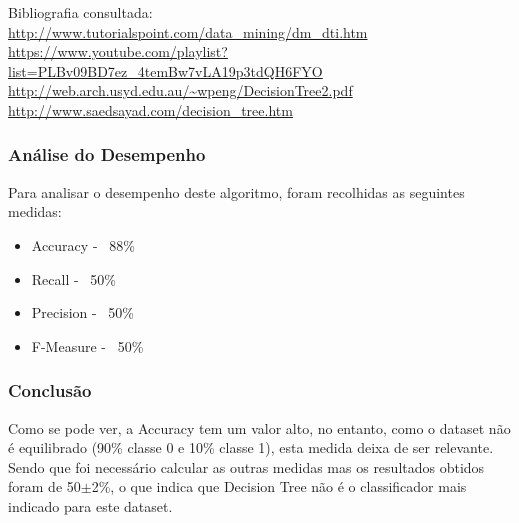 \documentclass[portugues,final]{revdetua}
\begin{document}
Bibliografia consultada:\\
\url{http://www.tutorialspoint.com/data_mining/dm_dti.htm}\\
\url{https://www.youtube.com/playlist?list=PLBv09BD7ez_4temBw7vLA19p3tdQH6FYO }\\
\url{http://web.arch.usyd.edu.au/~wpeng/DecisionTree2.pdf}\\
\url{http://www.saedsayad.com/decision_tree.htm}\\
\subsubsection{Análise do Desempenho}
Para analisar o desempenho deste algoritmo, foram recolhidas as seguintes medidas:
\begin{itemize}
\item Accuracy - ~88\%
\item Recall - ~50\%
\item Precision - ~50\%
\item F-Measure - ~50\%
\end{itemize}
\subsubsection{Conclusão}
Como se pode ver, a Accuracy tem um valor alto, no entanto, como o dataset não é equilibrado (90\% classe 0 e 10\% classe 1), esta medida deixa de ser relevante.
Sendo que foi necessário calcular as outras medidas mas os resultados obtidos foram de 50$\pm$2\%, o que indica que Decision Tree não é o classificador mais indicado para este dataset.


\end{document}
